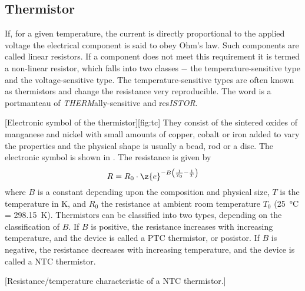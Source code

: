 \subsection{Thermistor}
If, for a given temperature, the current is directly proportional to the applied voltage the electrical component is said to obey Ohm's law. Such components are called linear resistors. If a component does not meet this requirement it is termed a non-linear resistor, which falls into two classes $-$ the temperature-sensitive type and the voltage-sensitive type. The temperature-sensitive types are often known as thermistors and change the resistance very reproducible. The word is a portmanteau of \textit{THERM}ally-sensitive and res\textit{ISTOR}.\par
{}[Electronic symbol of the thermistor][fig:tc]
They consist of the sintered oxides of manganese and nickel with small amounts of copper, cobalt or iron added to vary the properties and the physical shape is usually a bead, rod or a disc. The electronic symbol is shown in . The resistance is given by
\begin{equation}
	R = R_{0}\cdot\z{e}^{-B\left(\frac{1}{T_{0}} - \frac{1}{T}\right)}\label{eq:th}
\end{equation}
where $B$ is a constant depending upon the composition and physical size, $T$ is the temperature in \deg K, and $R_{0}$ the resistance at ambient room temperature $T_{0}$ (\SI{25}{\degreeCelsius} = \SI{298.15}{\kelvin}). Thermistors can be classified into two types, depending on the classification of $B$. If $B$ is positive, the resistance increases with increasing temperature, and the device is called a \ac{PTC} thermistor, or posistor. If $B$ is negative, the resistance decreases with increasing temperature, and the device is called a \ac{NTC} thermistor.

[Resistance/temperature characteristic of a \ac{NTC} thermistor.]

